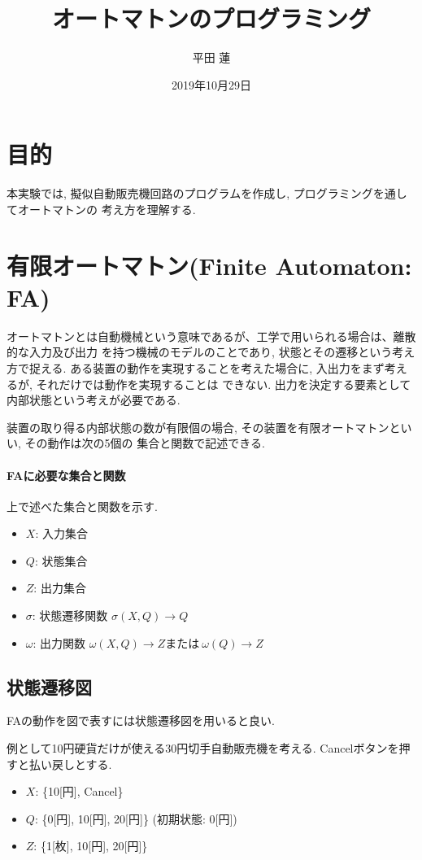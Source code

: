 \documentclass[titlepage]{jsarticle}
\title{オートマトンのプログラミング}
\author{平田 蓮}
\date{2019年10月29日}
\begin{document}
\maketitle
\section{目的}
    本実験では, 擬似自動販売機回路のプログラムを作成し, プログラミングを通してオートマトンの
    考え方を理解する.

\section{有限オートマトン(Finite Automaton: FA)}
    オートマトンとは自動機械という意味であるが、工学で用いられる場合は、離散的な入力及び出力
    を持つ機械のモデルのことであり, 状態とその遷移という考え方で捉える.
    ある装置の動作を実現することを考えた場合に, 入出力をまず考えるが, それだけでは動作を実現することは
    できない. 出力を決定する要素として内部状態という考えが必要である.

    装置の取り得る内部状態の数が有限個の場合, その装置を有限オートマトンといい, その動作は次の5個の
    集合と関数で記述できる.

    \paragraph{FAに必要な集合と関数}
        上で述べた集合と関数を示す.

        \begin{itemize}
            \item $X$: 入力集合
            \item $Q$: 状態集合
            \item $Z$: 出力集合
            \item $\sigma$: 状態遷移関数 $\sigma(X, Q) \rightarrow Q$
            \item $\omega$: 出力関数 $\omega(X, Q) \rightarrow Z または \ \omega(Q) \rightarrow Z$
        \end{itemize}

    \subsection{状態遷移図}
        FAの動作を図で表すには状態遷移図を用いると良い.

        例として10円硬貨だけが使える30円切手自動販売機を考える.
        Cancelボタンを押すと払い戻しとする.

        \begin{itemize}
            \item $X$: \{10[円], Cancel\}
            \item $Q$: \{0[円], 10[円], 20[円]\} (初期状態: 0[円])
            \item $Z$: \{1[枚], 10[円], 20[円]\}
        \end{itemize}
\end{document}
